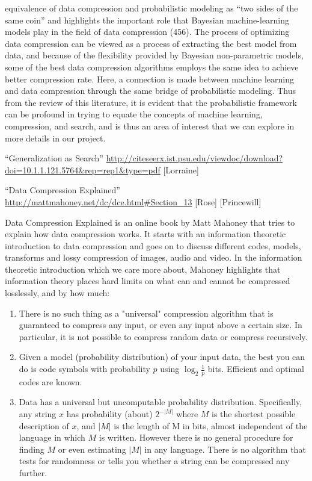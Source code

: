 \documentclass[12pt]{article}
\begin{document}
equivalence of data compression and probabilistic modeling as “two sides of the same coin”
and highlights the important role that Bayesian machine-learning models play in the field of
data compression (456). The process of optimizing data compression can be viewed as a
process of extracting the best model from data, and because of the flexibility provided by
Bayesian non-parametric models, some of the best data compression algorithms employs the
same idea to achieve better compression rate. Here, a connection is made between machine
learning and data compression through the same bridge of probabilistic modeling. Thus from
the review of this literature, it is evident that the probabilistic framework can be profound in
trying to equate the concepts of machine learning, compression, and search, and is thus an
area of interest that we can explore in more details in our project. 

“Generalization as Search”
\url{http://citeseerx.ist.psu.edu/viewdoc/download?doi=10.1.1.121.5764&rep=rep1&type=pdf} [Lorraine]

“Data Compression Explained” 
\url{http://mattmahoney.net/dc/dce.html#Section_13} [Rose] [Princewill]

Data Compression Explained is an online book by Matt Mahoney that tries to explain how data compression works. It starts with an information theoretic introduction to data compression and goes on to discuss different codes, models, transforms and lossy compression of images, audio and video. In the information theoretic introduction which we care more about, Mahoney highlights that information theory places hard limits on what can and cannot be compressed losslessly, and by how much:
\begin{enumerate}
\item There is no such thing as a "universal" compression algorithm that is guaranteed to compress any input, or even any input above a certain size. In particular, it is not possible to compress random data or compress recursively.
\item Given a model (probability distribution) of your input data, the best you can do is code symbols with probability $p$ using $\log_2 \frac{1}{p}$ bits. Efficient and optimal codes are known.
\item Data has a universal but uncomputable probability distribution. Specifically, any string $x$ has probability (about) $2^{-|M|}$ where $M$ is the shortest possible description of $x$, and $|M|$ is the length of M in bits, almost independent of the language in which $M$ is written. However there is no general procedure for finding $M$ or even estimating $|M|$ in any language. There is no algorithm that tests for randomness or tells you whether a string can be compressed any further.
\end{enumerate}
\end{document}
